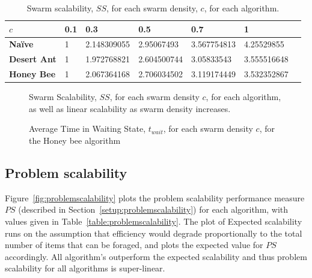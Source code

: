 \begin{table}[]
\centering
\caption{Swarm scalability, $SS$, for each swarm density, $c$, for each algorithm.}
\label{table:swarmscalability}
\begin{tabular}{@{}lllllll@{}}
\toprule
\textbf{$c$}            & \textbf{0.1} & \textbf{0.3}         & \textbf{0.5}         & \textbf{0.7}         & \textbf{1}           \\ \midrule
\textbf{Na\"ive}    & 1   & 2.148309055 & 2.95067493  & 3.567754813 & 4.25529855  \\
\textbf{Desert Ant} & 1   & 1.972768821 & 2.604500744 & 3.05833543  & 3.555516648 \\
\textbf{Honey Bee}  & 1   & 2.067364168 & 2.706034502 & 3.119174449 & 3.532352867 \\ \bottomrule
\end{tabular}
\end{table}

\begin{figure}[!htb]
\centering
\small
\resizebox{\textwidth}{!}{}
\caption{Swarm Scalability, $SS$, for each swarm density $c$, for each algorithm, as well as linear scalability as swarm density increases.}
\label{fig:swarmscalability}
\end{figure}

\begin{figure}[!htb]
\centering
\small
\resizebox{\textwidth}{!}{}
\caption{Average Time in Waiting State, $t_{wait}$, for each swarm density $c$, for the Honey bee algorithm}
\label{fig:swarmscalabilitywaitingtime}
\end{figure}


\subsection{Problem scalability}
\label{results:problemscalability}

Figure~\ref{fig:problemscalability} plots the problem scalability performance measure $PS$ (described in Section~\ref{setup:problemscalability}) for each algorithm, with values given in Table~\ref{table:problemscalability}. The plot of Expected scalability runs on the assumption that efficiency would degrade proportionally to the total number of items that can be foraged, and plots the expected value for $PS$ accordingly. All algorithm's outperform the expected scalability and thus problem scalability for all algorithms is super-linear. %

